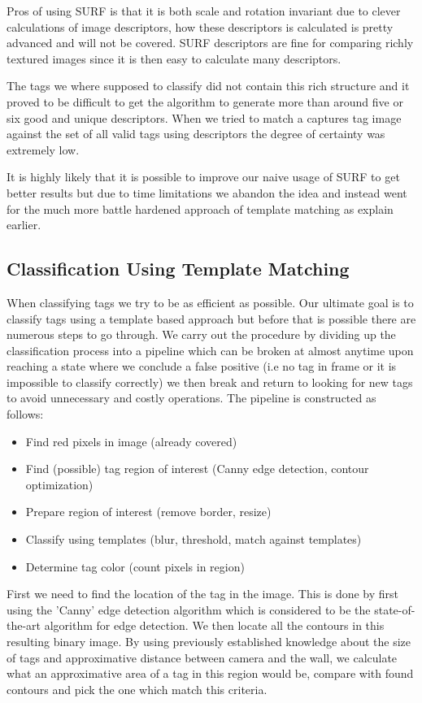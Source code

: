 Pros of using SURF is that it is both scale and rotation invariant due to clever calculations of image descriptors, how these descriptors is calculated is pretty advanced and will not be covered. SURF descriptors are fine for comparing richly textured images since it is then easy to calculate many descriptors.

The tags we where supposed to classify did not contain this rich structure and it proved to be difficult to get the algorithm to generate more than around five or six good and unique descriptors. When we tried to match a captures tag image against the set of all valid tags using descriptors the degree of certainty was extremely low. 

It is highly likely that it is possible to improve our naive usage of SURF to get better results but due to time limitations we abandon the idea and instead went for the much more battle hardened approach of template matching as explain earlier.

\subsection{Classification Using Template Matching}
When classifying tags we try to be as efficient as possible. Our ultimate goal is to classify tags using a template based approach but before that is possible there are numerous steps to go through. We carry out the procedure by dividing up the classification process into a pipeline which can be broken at almost anytime upon reaching a state where we conclude a false positive (i.e no tag in frame or it is impossible to classify correctly) we then break and return to looking for new tags to avoid unnecessary and costly operations. The pipeline is constructed as follows:

\begin{itemize}
\item Find red pixels in image (already covered)
\item Find (possible) tag region of interest (Canny edge detection, contour optimization)
\item Prepare region of interest (remove border, resize)
\item Classify using templates (blur, threshold, match against templates)
\item Determine tag color (count pixels in region)
\end{itemize}

First we need to find the location of the tag in the image. This is done by first using the 'Canny' edge detection algorithm which is considered to be the state-of-the-art algorithm for edge detection. We then locate all the contours in this resulting binary image. By using previously established knowledge about the size of tags and approximative distance between camera and the wall, we calculate what an approximative area of a tag in this region would be, compare with found contours and pick the one which match this criteria. 

